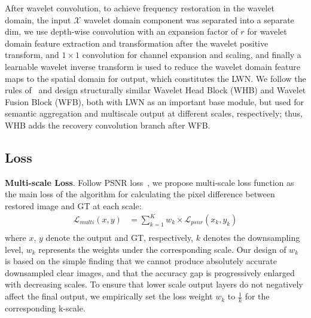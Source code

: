 \documentclass[10pt,twocolumn,letterpaper]{article}
\begin{document}
\par After wavelet convolution, to achieve frequency restoration in the wavelet domain, the input $\mathcal{X}$ wavelet domain component was separated into a separate dim, we use depth-wise convolution with an expansion factor of $r$ for wavelet domain feature extraction and transformation after the wavelet positive transform, and $1\times1$ convolution for channel expansion and scaling, and finally a learnable wavelet inverse transform is used to reduce the wavelet domain feature maps to the spatial domain for output, which constitutes the LWN. We follow the rules of~\cite{chen2022simple} and design structurally similar Wavelet Head Block (WHB) and Wavelet Fusion Block (WFB), both with LWN as an important base module, but used for semantic aggregation and multiscale output at different scales, respectively; 
thus, WHB adds the recovery convolution branch after WFB.

\subsection{Loss}
\label{loss}
\textbf{Multi-scale Loss}. Follow PSNR loss~\cite{chen2022simple}, we propose multi-scale loss function as the main loss of the algorithm for calculating the pixel difference between restored image and GT at each scale:
\begin{equation}
	\begin{aligned}
		\mathcal{L}_{multi}(x, y) &= \sum_{k=1}^{K} w_k \times \mathcal{L}_{psnr}\left(x_k, y_k\right) \\
	\end{aligned}
	\label{eq:multi_loss}
\end{equation}
where $x$, $y$ denote the output and GT, respectively, $k$ denotes the downsampling level, $w_k$ represents the weights under the corresponding scale.
Our design of $w_{k}$ is based on the simple finding that we cannot produce absolutely accurate downsampled clear images, 
and that the accuracy gap is progressively enlarged with decreasing scales.
To ensure that lower scale output layers do not negatively affect the final output, we empirically set the loss weight $w_k$ to $\frac{1}{k}$ for the corresponding k-scale.
\end{document}
